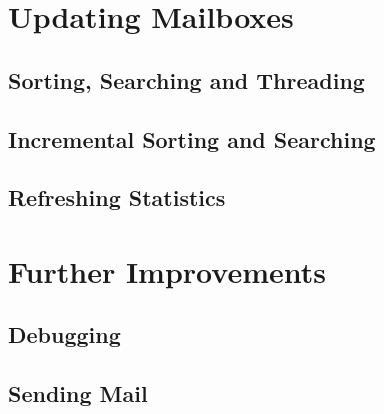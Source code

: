 \documentclass[trojita]{subfiles}
\begin{document}
\cite{rfc5259}

\section{Updating Mailboxes}

\subsection{Sorting, Searching  and Threading}

\cite{rfc5256}
\cite{rfc5957}

\subsection{Incremental Sorting and Searching}

\cite{rfc5267}

\subsection{Refreshing Statistics}

\cite{rfc5465}

\section{Further Improvements}

\subsection{Debugging}

\subsection{Sending Mail}
\end{document}
